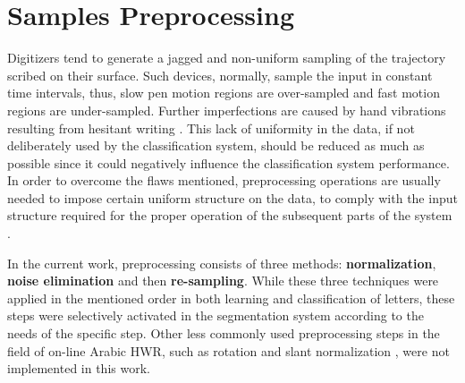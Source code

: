 
\newpage{}

\section{Samples Preprocessing}
\label{sec:preprocessing}

\iftoggle{edit-mode}{\hspace{0pt}\marginpar{Introduction}}{}
Digitizers tend to generate a jagged and non-uniform sampling of the trajectory scribed on their surface.
Such devices, normally, sample the input in constant time intervals, thus, slow pen motion regions are over-sampled and fast motion regions are under-sampled.
Further imperfections are caused by hand vibrations resulting from hesitant writing \cite{huang2009preprocessing}.
This lack of uniformity in the data, if not deliberately used by the classification system, should be reduced as much as possible since it could negatively influence the classification system performance.
In order to overcome the flaws mentioned, preprocessing operations are usually needed to impose certain uniform structure on the data, to comply with the input structure required for the proper operation of the subsequent parts of the system \cite{al2011online}.

\iftoggle{edit-mode}{\hspace{0pt}\marginpar{Preprocessing steps usage}}{}
In the current work, preprocessing consists of three methods: \textbf{normalization}, \textbf{noise elimination} and then \textbf{re-sampling}.
While these three techniques were applied in the mentioned order in both learning and classification of letters, these steps were selectively activated in the segmentation system according to the needs of the specific step.
Other less commonly used preprocessing steps in the field of on-line Arabic HWR, such as rotation and slant normalization \cite{jaeger2001online}, were not implemented in this work. 


